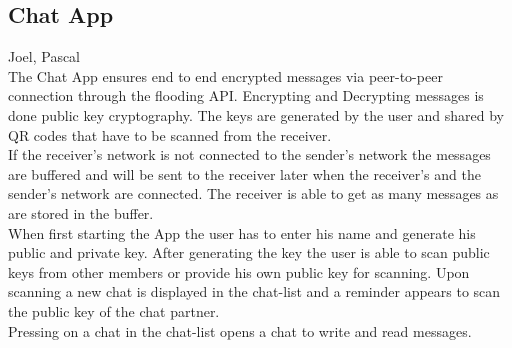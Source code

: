 \subsection{Chat App}
Joel, Pascal\\
The Chat App ensures end to end encrypted messages via peer-to-peer connection through the flooding API. Encrypting and Decrypting messages is done public key cryptography. The keys are generated by the user and shared by QR codes that have to be scanned from the receiver.\\
If the receiver's network is not connected to the sender's network the messages are buffered and will be sent to the receiver later when the receiver's and the sender's network are connected. The receiver is able to get as many messages as are stored in the buffer.\\
When first starting the App the user has to enter his name and generate his public and private key. After generating the key the user is able to scan public keys from other members or provide his own public key for scanning. Upon scanning a new chat is displayed in the chat-list and a reminder appears to scan the public key of the chat partner. \\
Pressing on a chat in the chat-list opens a chat to write and read messages.\\
